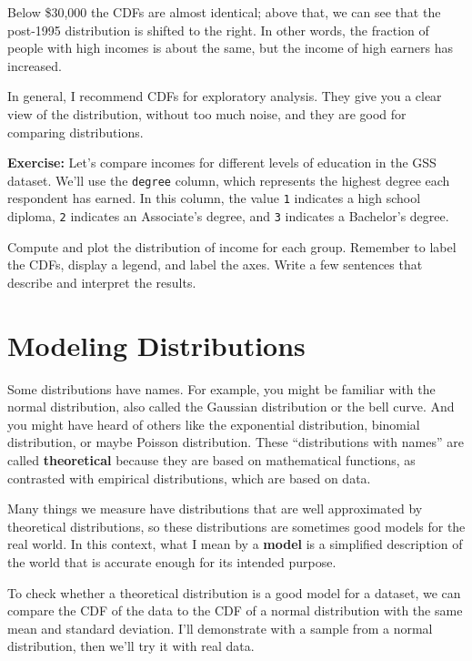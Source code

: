 \documentclass[
]{book}
\newcommand{\passthrough}[1]{#1}
\begin{document}
Below \$30,000 the CDFs are almost identical; above that, we can see
that the post-1995 distribution is shifted to the right. In other words,
the fraction of people with high incomes is about the same, but the
income of high earners has increased.

In general, I recommend CDFs for exploratory analysis. They give you a
clear view of the distribution, without too much noise, and they are
good for comparing distributions.

\textbf{Exercise:} Let's compare incomes for different levels of
education in the GSS dataset. We'll use the
\passthrough{\lstinline!degree!} column, which represents the highest
degree each respondent has earned. In this column, the value
\passthrough{\lstinline!1!} indicates a high school diploma,
\passthrough{\lstinline!2!} indicates an Associate's degree, and
\passthrough{\lstinline!3!} indicates a Bachelor's degree.

Compute and plot the distribution of income for each group. Remember to
label the CDFs, display a legend, and label the axes. Write a few
sentences that describe and interpret the results.

\section{Modeling Distributions}\label{modeling-distributions}

Some distributions have names. For example, you might be familiar with
the normal distribution, also called the Gaussian distribution or the
bell curve. And you might have heard of others like the exponential
distribution, binomial distribution, or maybe Poisson distribution.
These ``distributions with names'' are called \textbf{theoretical}
because they are based on mathematical functions, as contrasted with
empirical distributions, which are based on data.

Many things we measure have distributions that are well approximated by
theoretical distributions, so these distributions are sometimes good
models for the real world. In this context, what I mean by a
\textbf{model} is a simplified description of the world that is accurate
enough for its intended purpose.

To check whether a theoretical distribution is a good model for a
dataset, we can compare the CDF of the data to the CDF of a normal
distribution with the same mean and standard deviation. I'll demonstrate
with a sample from a normal distribution, then we'll try it with real
data.
\end{document}
